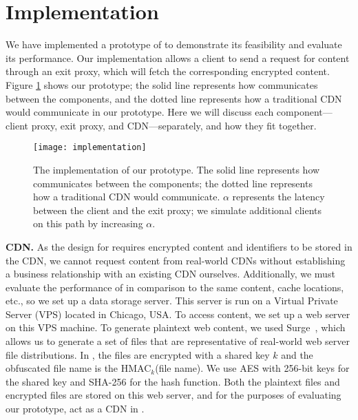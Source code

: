 \section{Implementation}
\label{sec:implementation}

We have implemented a prototype of \system{} to demonstrate its feasibility and 
evaluate its performance.  Our implementation allows a client to send a request 
for content through an exit proxy, which will fetch the corresponding 
encrypted content.  Figure \ref{fig:impl} shows our prototype; the solid line represents
how \system{} communicates between the components, and the dotted line represents how 
a traditional CDN would communicate in our prototype.  Here we will discuss each component---client proxy, exit proxy, 
and CDN---separately, and how they fit together.

\begin{figure}[t]
\centering
\texttt{[image: implementation]}
\caption{The implementation of our \system{} prototype.  The solid line represents
how \system{} communicates between the components; the dotted line represents how 
a traditional CDN would communicate. $\alpha$ represents the latency between the client 
and the exit proxy; we simulate additional clients on this path by increasing $\alpha$.}
\label{fig:impl}
\end{figure}

\textbf{CDN.} As the design for \system{} requires encrypted content and identifiers
to be stored in the CDN, we cannot request content from real-world CDNs without
establishing a business relationship with an existing CDN ourselves. Additionally,
we must evaluate the performance of \system{} in comparison to the same content, cache locations, etc., so 
we set up a data storage server.  This server is run on a Virtual Private Server
(VPS) located in
Chicago, USA.  To access content, we set up a web server on this VPS machine.  To generate 
plaintext web content, we used Surge~\cite{barford1998generating}, which allows us 
to generate a set of files that are representative of real-world web server file distributions.  
In \system{}, the files are encrypted with a shared key $k$ and the obfuscated file name is the 
HMAC$_{k}$(file name).  We use AES with 256-bit keys for the shared key and SHA-256
for the 
hash function.  Both the plaintext files and encrypted files are stored on this web server, and 
for the purposes of evaluating our prototype, act as a CDN in \system{}.

